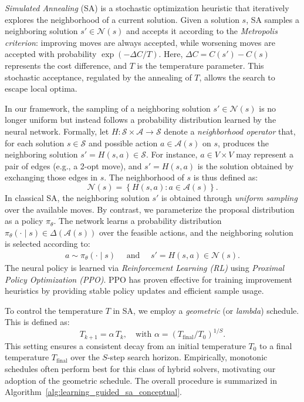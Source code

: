 \documentclass[letterpaper]{article} %
\begin{document}
\textit{Simulated Annealing} (SA) is a stochastic optimization heuristic that iteratively explores the neighborhood of a current solution. Given a solution $s$, SA samples a neighboring solution $s' \in \mathcal{N}(s)$ and accepts it according to the \textit{Metropolis criterion}: improving moves are always accepted, while worsening moves are accepted with probability $\exp(-\Delta C / T)$. Here, $\Delta C = C(s') - C(s)$ represents the cost difference, and $T$ is the temperature parameter. This stochastic acceptance, regulated by the annealing of $T$, allows the search to escape local optima.

In our framework, the sampling of a neighboring solution $s' \in \mathcal{N}(s)$ is no longer uniform but instead follows a probability distribution learned by the neural network. Formally, let $H: \mathcal{S} \times \mathcal{A} \to \mathcal{S}$ denote a \textit{neighborhood operator} that, for each solution $s \in \mathcal{S}$ and possible action $a \in \mathcal{A}(s)$ on $s$, produces the neighboring solution $s' = H(s, a) \in \mathcal{S}$. For instance, $a \in V \times V$ may represent a pair of edges (e.g., a 2-opt move), and $s' = H(s, a)$ is the solution obtained by exchanging those edges in $s$. The neighborhood of $s$ is thus defined as:
$$
\mathcal{N}(s) = \left\{ H(s, a) : a \in \mathcal{A}(s) \right\}.
$$
In classical SA, the neighboring solution $s'$ is obtained through \textit{uniform sampling} over the available moves. By contrast, we parameterize the proposal distribution as a policy $\pi_\theta$. The network learns a probability distribution $\pi_\theta(\cdot \mid s) \in \Delta(\mathcal{A}(s))$ over the feasible actions, and the neighboring solution is selected according to:
\begin{align*}
a \sim \pi_\theta(\cdot \mid s) \quad \text{ and } \quad s' = H(s, a) \in \mathcal{N}(s).
\end{align*}
The neural policy is learned via \textit{Reinforcement Learning (RL)} using \textit{Proximal Policy Optimization (PPO)}. PPO has proven effective for training improvement heuristics by providing stable policy updates and efficient sample usage.

To control the temperature $T$ in SA, we employ a \textit{geometric} (or \textit{lambda}) schedule. This is defined as:
$$
T_{k+1} = \alpha \, T_k, \quad \text{with } \alpha = \left( T_\mathrm{final} / T_0 \right)^{1/S}.
$$
This setting ensures a consistent decay from an initial temperature $T_0$ to a final temperature $T_\mathrm{final}$ over the $S$-step search horizon. Empirically, monotonic schedules often perform best for this class of hybrid solvers, motivating our adoption of the geometric schedule. The overall procedure is summarized in Algorithm~\ref{alg:learning_guided_sa_conceptual}.
\end{document}
